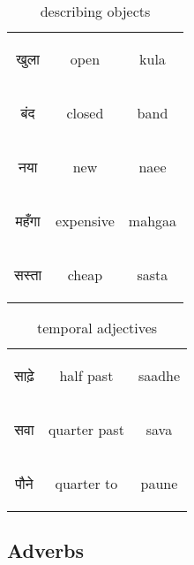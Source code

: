 \begin{table}[H]
    \centering
    \begin{tabular}{c|c|c}
        \begin{hindi} खुला \end{hindi} & open & kula \\
        \begin{hindi} बंद \end{hindi} & closed & band \\
        \begin{hindi} नया \end{hindi} & new & naee \\
        \begin{hindi} महँगा \end{hindi} & expensive & mahgaa \\
        \begin{hindi} सस्ता \end{hindi} & cheap & sasta \\
    \end{tabular}
    \caption{describing objects}
    \label{tab:adjectives_object_describing}
\end{table}

\begin{table}[H]
    \centering
    \begin{tabular}{c|c|c}
        \begin{hindi} साढ़े \end{hindi} & half past  & saadhe \\
        \begin{hindi} सवा \end{hindi} & quarter past  & sava \\
        \begin{hindi} पौने \end{hindi} & quarter to  & paune \\
    \end{tabular}
    \caption{temporal adjectives}
    \label{tab:adjectives_temporal}
\end{table}

\newpage
\subsection{Adverbs}

